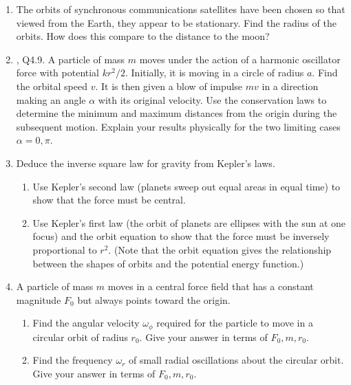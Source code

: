 \documentclass[../psets.tex]{subfiles}
\begin{document}
\begin{enumerate}
\begin{enumerate}
    \end{enumerate}
    \item The orbits of synchronous communications satellites have been chosen so that viewed from the Earth, they appear to be stationary. Find the radius of the orbits. How does this compare to the distance to the moon?
    \item \textcite{bib:KibbleBerkshire}, Q4.9. A particle of mass $m$ moves under the action of a harmonic oscillator force with potential $kr^2/2$. Initially, it is moving in a circle of radius $a$. Find the orbital speed $v$. It is then given a blow of impulse $mv$ in a direction making an angle $\alpha$ with its original velocity. Use the conservation laws to determine the minimum and maximum distances from the origin during the subsequent motion. Explain your results physically for the two limiting cases $\alpha=0,\pi$.
    \item Deduce the inverse square law for gravity from Kepler's laws.
    \begin{enumerate}
        \item Use Kepler's second law (planets sweep out equal areas in equal time) to show that the force must be central.
        \item Use Kepler's first law (the orbit of planets are ellipses with the sun at one focus) and the orbit equation to show that the force must be inversely proportional to $r^2$. (Note that the orbit equation gives the relationship between the shapes of orbits and the potential energy function.)
    \end{enumerate}
    \item A particle of mass $m$ moves in a central force field that has a constant magnitude $F_0$ but always points toward the origin.
    \begin{enumerate}
        \item Find the angular velocity $\omega_\phi$ required for the particle to move in a circular orbit of radius $r_0$. Give your answer in terms of $F_0,m,r_0$.
        \item Find the frequency $\omega_r$ of small radial oscillations about the circular orbit. Give your answer in terms of $F_0,m,r_0$.
    \end{enumerate}
\end{enumerate}
\end{document}
